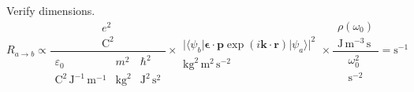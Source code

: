 Verify dimensions.
\begin{equation*}
R_{a\rightarrow b}\propto
\frac{\begin{matrix}
e^2
\\
\text{C}^2
\end{matrix}
}{\begin{matrix}
\varepsilon_0 & m^2 & \hbar^2
\\
\text{C}^2\,\text{J}^{-1}\,\text{m}^{-1}
& \text{kg}^2 & \text{J}^2\,\text{s}^2
\end{matrix}}
\times
\begin{matrix}
\\
\bigl|\langle\psi_b|\boldsymbol{\epsilon}\cdot\mathbf p\exp(i\mathbf k\cdot\mathbf r)|\psi_a\rangle\bigr|^2
\\
\text{kg}^2\,\text{m}^2\,\text{s}^{-2}
\end{matrix}
\times
\frac{
\begin{matrix}
\rho(\omega_0)
\\
\text{J}\,\text{m}^{-3}\,\text{s}
\end{matrix}
}{
\begin{matrix}
\omega_0^2
\\
\text{s}^{-2}
\end{matrix}
}
=\text{s}^{-1}
\end{equation*}


